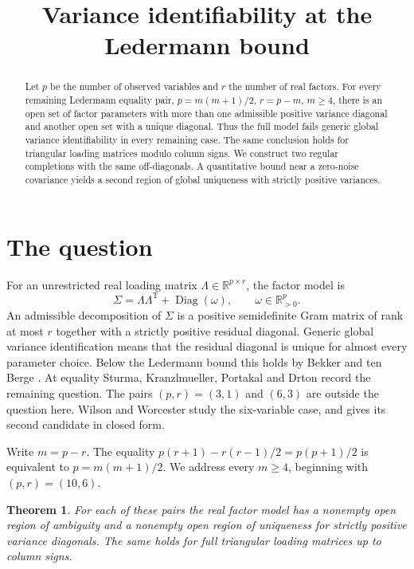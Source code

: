\documentclass[11pt,a4paper]{amsart}
\title[Variance identifiability at the Ledermann bound]{Variance identifiability at the Ledermann bound}
\date{}
\newtheorem{theorem}{Theorem}
\newcommand{\R}{\mathbb R}
\newcommand{\Diag}{\operatorname{Diag}}
\begin{document}
\begin{abstract}
Let $p$ be the number of observed variables and $r$ the number of real factors. For every remaining Ledermann equality pair, $p=m(m+1)/2$, $r=p-m$, $m\ge4$, there is an open set of factor parameters with more than one admissible positive variance diagonal and another open set with a unique diagonal. Thus the full model fails generic global variance identifiability in every remaining case. The same conclusion holds for triangular loading matrices modulo column signs. We construct two regular completions with the same off-diagonals. A quantitative bound near a zero-noise covariance yields a second region of global uniqueness with strictly positive variances.
\end{abstract}
\maketitle

\section{The question}

For an unrestricted real loading matrix $\Lambda\in\R^{p\times r}$, the factor model is
\[
 \Sigma=\Lambda\Lambda^{\mathrm T}+\Diag(\omega),
 \qquad \omega\in\R_{>0}^{p}.
\]
An admissible decomposition of $\Sigma$ is a positive semidefinite Gram matrix of rank at most $r$ together with a strictly positive residual diagonal. Generic global variance identification means that the residual diagonal is unique for almost every parameter choice. Below the Ledermann bound this holds by Bekker and ten Berge \cite{bekker}. At equality Sturma, Kranzlmueller, Portakal and Drton \cite[Theorem 3.7 and Example 3.8]{sturma} record the remaining question. The pairs $(p,r)=(3,1)$ and $(6,3)$ are outside the question here. Wilson and Worcester \cite{wilson} study the six-variable case, and \cite{bekker} gives its second candidate in closed form.

Write $m=p-r$. The equality
$ p(r+1)-r(r-1)/2=p(p+1)/2$
is equivalent to $p=m(m+1)/2$. We address every $m\ge4$, beginning with $(p,r)=(10,6)$.

\begin{theorem}
For each of these pairs the real factor model has a nonempty open region of ambiguity and a nonempty open region of uniqueness for strictly positive variance diagonals. The same holds for full triangular loading matrices up to column signs.
\end{theorem}
\end{document}
